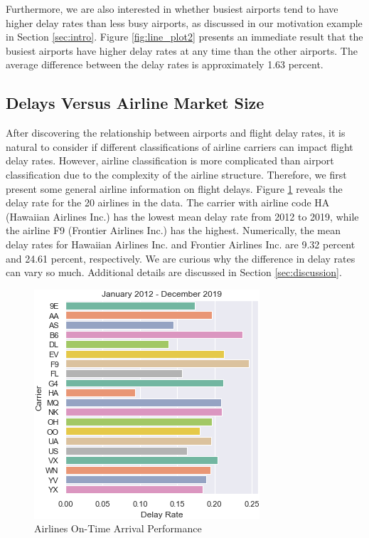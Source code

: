 \documentclass[11pt]{article}
\begin{document}
Furthermore, we are also interested in whether busiest airports tend to have higher delay rates than less busy airports, as discussed in our motivation example in Section \ref{sec:intro}. Figure \ref{fig:line_plot2} presents an immediate result that the busiest airports have higher delay rates at any time than the other airports. The average difference between the delay rates is approximately 1.63 percent.

\subsection{Delays Versus Airline Market Size}\label{sec:market}
After discovering the relationship between airports and flight delay rates, it is natural to consider if different classifications of airline carriers can impact flight delay rates. However, airline classification is more complicated than airport classification due to the complexity of the airline structure. Therefore, we first present some general airline information on flight delays. Figure \ref{fig:bar_plot2} reveals the delay rate for the 20 airlines in the data. The carrier with airline code HA (Hawaiian Airlines Inc.) has the lowest mean delay rate from 2012 to 2019, while the airline F9 (Frontier Airlines Inc.) has the highest. Numerically, the mean delay rates for Hawaiian Airlines Inc. and Frontier Airlines Inc. are 9.32 percent and 24.61 percent, respectively. We are curious why the difference in delay rates can vary so much. Additional details are discussed in Section \ref{sec:discussion}.

\begin{figure}[h!]
\centering
\includegraphics[width = \columnwidth]{bar_plot2}
\caption{Airlines On-Time Arrival Performance}\label{fig:bar_plot2}
\end{figure}
\end{document}
